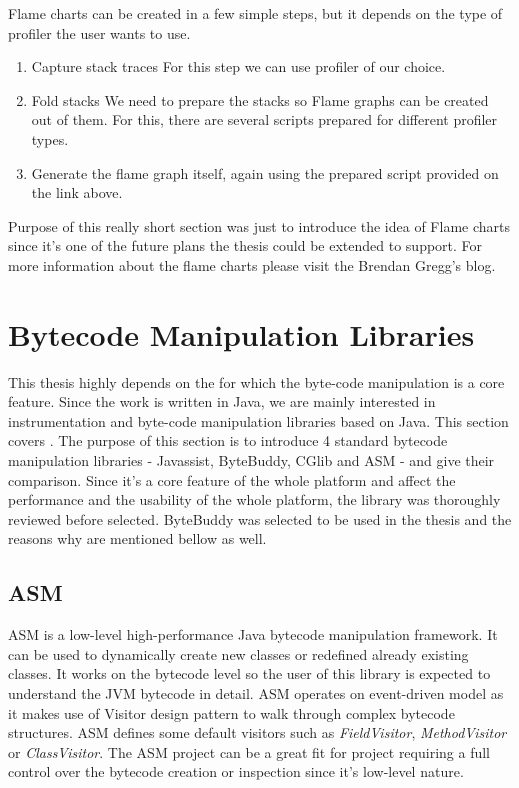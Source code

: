 Flame charts can be created in a few simple steps, but it depends on the type of profiler the user wants to use. 
\begin{enumerate}
	\item Capture stack traces
	For this step we can use profiler of our choice.
	\item Fold stacks
	We need to prepare the stacks so Flame graphs can be created out of them. For this, there are several scripts prepared for different profiler types.
	\item Generate the flame graph itself, again using the prepared script provided on the link above.
\end{enumerate}

Purpose of this really short section was just to introduce the idea of Flame charts since it's one of the future plans the thesis could be extended to support. For more information about the flame charts please visit the Brendan Gregg's blog.
\section{Bytecode Manipulation Libraries}
This thesis highly depends on the  for which the byte-code manipulation is a core feature. Since the work is written in Java, we are mainly interested in instrumentation and byte-code manipulation libraries based on Java. This section covers . The purpose of this section is to introduce 4 standard bytecode manipulation libraries - Javassist, ByteBuddy, CGlib and ASM - and give their comparison. Since it's a core feature of the whole platform and affect the performance and the usability of the whole platform, the library was thoroughly reviewed before selected. ByteBuddy was selected to be used in the thesis and the reasons why are mentioned bellow as well.

\subsection{ASM}
ASM is a low-level high-performance Java bytecode manipulation framework. It can be used to dynamically create new classes or redefined already existing classes. It works on the bytecode level so the user of this library is expected to understand the JVM bytecode in detail. ASM operates on event-driven model as it makes use of Visitor design pattern to walk through complex bytecode structures. ASM defines some default visitors such as \textit{FieldVisitor}, \textit{MethodVisitor} or \textit{ClassVisitor}. The ASM project can be a great fit for project requiring a full control over the bytecode creation or inspection since it's low-level nature.
